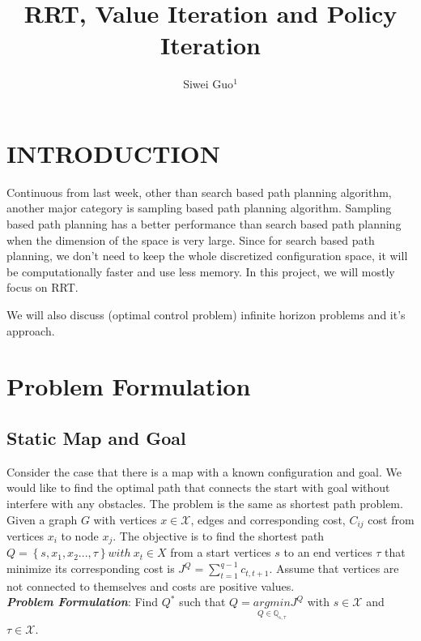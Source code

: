 \documentclass[letterpaper, 10 pt, conference]{ieeeconf}  %
\title{\LARGE \bf
RRT, Value Iteration and Policy Iteration 
}
\author{Siwei Guo$^{1}$%
}
\begin{document}
\maketitle
\thispagestyle{empty}
\pagestyle{empty}

\newcommand{\xn}{x_{near}}
\newcommand{\xr}{x_{rand}}




\section{INTRODUCTION}
Continuous from last week, other than search based path planning algorithm, another major category is sampling based path planning algorithm. Sampling based path planning has a better performance than search based path planning when the dimension of the space is very large. Since for search based path planning, we don't need to keep the whole discretized configuration space, it will be computationally faster and use less memory. In this project, we will mostly focus on RRT. 

We will also discuss (optimal control problem) infinite horizon problems and it's approach. 


\section{Problem Formulation}

\subsection{Static Map and Goal}
Consider the case that there is a map with a known configuration and goal. We would like to find the optimal path that connects the 
start with goal without interfere with any obstacles. The problem is the same as shortest path problem. Given a graph $G$ with 
vertices $x \in \mathcal{X}$, edges and corresponding cost, $C_{ij}$ cost from vertices $x_i$ to node $x_j$. The objective is to find 
the shortest path $Q = \left \{ s, x_1, x_2...,\tau \right \} with \ x_t \in X$ from a start vertices $s$ to an end vertices $\tau$ 
that minimize its corresponding cost is $J^Q =  \sum_{t=1}^{q-1}c_{t,t+1}$. Assume that vertices are not connected to themselves and 
costs are positive values. \\

\textbf{\textit{Problem Formulation}}: 
Find $Q^*$ such that 
\begin{math}
Q = \underset{Q \in \mathbb{Q_{s,\tau}}}{argmin}J^Q
\end{math} with $s\in \mathcal{X}$ and $\tau \in \mathcal{X}$.
\end{document}
